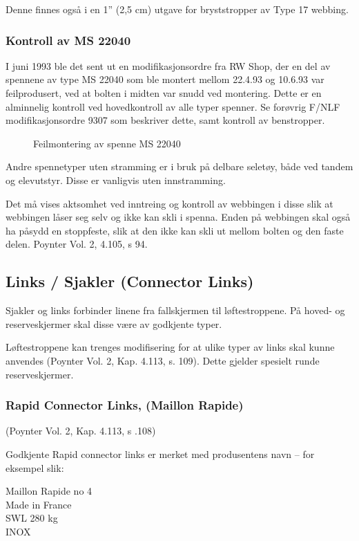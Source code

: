 Denne finnes også i en 1'' (2,5 cm) utgave for bryststropper av Type 17 webbing.

\subsubsection{Kontroll av MS 22040}
I juni 1993 ble det sent ut en modifikasjonsordre fra RW Shop, der en del av spennene av type MS 22040 som ble montert mellom 22.4.93 og 10.6.93 var feilprodusert, ved at bolten i midten var snudd ved montering. Dette er en alminnelig kontroll ved hovedkontroll av alle typer spenner. Se forøvrig F/NLF modifikasjonsordre 9307 som beskriver dette, samt kontroll av benstropper.

\begin{figure}
	\caption{Feilmontering av spenne MS 22040}
\end{figure}

Andre spennetyper uten stramming er i bruk på delbare seletøy, både ved tandem og elevutstyr. Disse er vanligvis uten innstramming.

Det må vises aktsomhet ved inntreing og kontroll av webbingen i disse slik at webbingen låser seg selv og ikke kan skli i spenna. Enden på webbingen skal også ha påsydd en stoppfeste, slik at den ikke kan skli ut mellom bolten og den faste delen. Poynter Vol. 2, 4.105, s 94.

\subsection{Links / Sjakler (Connector Links)}
Sjakler og links forbinder linene fra fallskjermen til løftestroppene. På hoved- og reserveskjermer skal disse være av godkjente typer.

Løftestroppene kan trenges modifisering for at ulike typer av links skal kunne anvendes (Poynter Vol. 2, Kap. 4.113, s. 109). Dette gjelder spesielt runde reserveskjermer.

\subsubsection{Rapid Connector Links, (Maillon Rapide)}
(Poynter Vol. 2, Kap. 4.113, s .108)

Godkjente Rapid connector links er merket med produsentens navn – for eksempel slik:

Maillon Rapide no 4 \\
Made in France \\
SWL 280 kg \\
INOX

